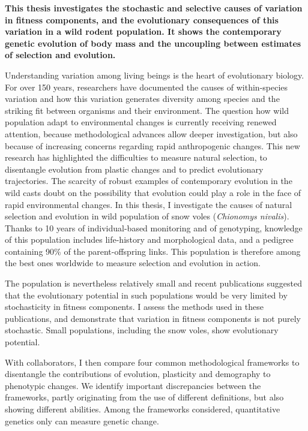 \begin{summary}
\textbf{
This thesis investigates the stochastic and selective causes of variation in fitness components, and the evolutionary consequences of this variation in a wild rodent population. 
It shows the contemporary genetic evolution of body mass and the uncoupling between estimates of selection and evolution. 
}

Understanding variation among living beings is the heart of evolutionary biology. For over 150 years, researchers have documented the causes of within-species variation and how this variation generates diversity among species and the striking fit between organisms and their environment. The question how wild population adapt to environmental changes is currently receiving renewed attention, because methodological advances allow deeper investigation, but also because of increasing concerns regarding rapid anthropogenic changes. This new research has highlighted the difficulties to measure natural selection, to disentangle evolution from plastic changes and to predict evolutionary trajectories. The scarcity of robust examples of contemporary evolution in the wild casts doubt on the possibility that evolution could play a role in the face of rapid environmental changes.
In this thesis, I investigate the causes of natural selection and evolution in wild population of snow voles (\textit{Chionomys nivalis}). Thanks to 10 years of individual-based monitoring and of genotyping, knowledge of this population includes life-history and morphological data, and a pedigree containing 90\% of the parent-offspring links. This population is therefore among the best ones worldwide to measure selection and evolution in action. 

The population is nevertheless relatively small and recent publications suggested that the evolutionary potential in such populations would be very limited by stochasticity in fitness components. I assess the methods used in these publications, and demonstrate that variation in fitness components is not purely stochastic. Small populations, including the snow voles, show evolutionary potential. 
 
With collaborators, I then compare four common methodological frameworks to disentangle the contributions of evolution, plasticity and demography to phenotypic changes. We identify important discrepancies between the frameworks, partly originating from the use of different definitions, but also showing different abilities. Among the frameworks considered, quantitative genetics only can measure genetic change.


\end{summary}
